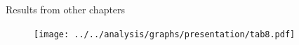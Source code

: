 \documentclass[aspectratio=169,handout]{beamer} %
\newcommand\mynum[1]{%
  \usebeamercolor{enumerate item}%
  \tikzset{beameritem/.style={circle,inner sep=0,minimum size=2ex,text=enumerate item.bg,fill=enumerate item.fg,font=\footnotesize}}%
  \tikz[baseline=(n.base)]\node(n)[beameritem]{#1};%
}	%
\begin{document}
\begin{frame}{Results from other chapters}
\label{OTHER_CHAPTERS}
\begin{figure}
	\texttt{[image: ../../analysis/graphs/presentation/tab8.pdf]}
\end{figure}
\hyperlink{BACK_FROM_MZ}{}
\end{frame}






%
%
%
%
%
%
%
%
\end{document}
